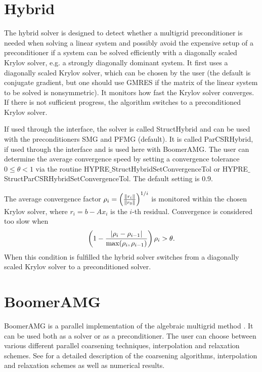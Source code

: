 

\section{Hybrid}

The hybrid solver is designed to detect whether a multigrid preconditioner
is needed when solving a linear system and possibly avoid the expensive setup
of a preconditioner if a system can be solved efficiently with a diagonally
scaled Krylov solver, e.g. a strongly diagonally dominant system. 
It first uses a diagonally scaled Krylov solver, which can be chosen by the user
(the default is conjugate gradient, but one should use GMRES if the matrix of the 
linear system to be solved is nonsymmetric). It monitors how fast the Krylov solver
converges.
If there is not sufficient progress, the algorithm switches to a preconditioned
Krylov solver.

If used through the  interface, the solver is called StructHybrid
and can be used with the preconditioners SMG and PFMG (default).
It is called ParCSRHybrid, if used through the  interface and is used here
with BoomerAMG.
The user can determine the average convergence speed by setting a convergence tolerance $0 \leq \theta
< 1$
via the routine HYPRE$\_$StructHybridSetConvergenceTol or HYPRE$\_$StructParCSRHybridSetConvergenceTol.
The default setting is 0.9.

The average convergence factor $\rho_i = \left({{\| r_i \|} \over {\| r_0 \|}}\right)^{1/i}$ is
monitored within the chosen Krylov solver, where $r_i = b - Ax_{i}$ is the $i$-th residual.
Convergence is considered too slow when
\begin{equation}
\left( 1 - {{|\rho_i - \rho_{i-1}|} \over { \max(\rho_i, \rho_{i-1})}} \right) \rho_i > \theta .
\end{equation}
When this condition is fulfilled the hybrid solver switches from a diagonally scaled 
Krylov solver to a preconditioned solver.


\section{BoomerAMG}

BoomerAMG is a parallel implementation of the algebraic multigrid 
method \cite{Ruge_Stueben_1987}. 
It can be used
both as a solver or as a preconditioner.  The user can choose between various
different parallel coarsening techniques, interpolation and relaxation schemes.
See
\cite{VEHenson_UMYang_2002,UMYang_2005} for a detailed description of the 
coarsening
algorithms, interpolation and relaxation schemes as well as numerical results.  

